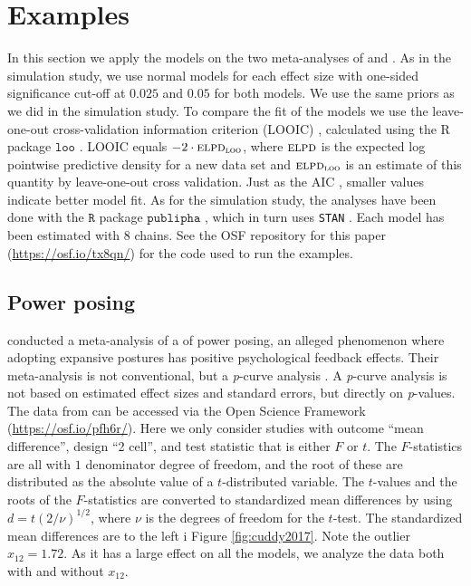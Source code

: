 \documentclass{article}
\theoremstyle{plain}
\theoremstyle{definition}
\renewcommand{\sqrt}[1]{(#1)^{1/2}}
\begin{document}
\section{Examples}\label{sect:examples}
In this section we apply the models on the two meta-analyses of \citet{cuddy2018p} and \citet{anderson2010violent}. As in the simulation study, we use normal models for each effect size with one-sided significance cut-off at $0.025$ and $0.05$ for both models. We use the same priors as we did in the simulation study. To compare the fit of the models we use the leave-one-out cross-validation information criterion (\textsc{LOOIC}) \citep{loo_article}, calculated using the R \citep{R} package $\mathtt{loo}$ \citep{loo}. LOOIC equals $-2\cdot\textsc{elpd}_{\textsc{loo}}$, where $\textsc{elpd}$ is the expected log pointwise predictive density for a new data set and $\textsc{elpd}_\textsc{loo}$ is an estimate of this quantity by leave-one-out cross validation. Just as the \textsc{AIC} \citep{akaike1998information}, smaller values indicate better model fit. As for the simulation study, the analyses have been done with the $\mathtt{R}$ package $\mathtt{publipha}$ \citep{publipha}, which in turn uses \texttt{STAN} \citep{Carpenter2017-cf}. Each model has been estimated with $8$ chains. See the OSF repository for this paper (\url{https://osf.io/tx8qn/}) for the code used to run the examples.

\subsection{Power posing\label{subsec:cuddy2018}}

\citet{cuddy2018p} conducted a meta-analysis of a of power posing, an alleged phenomenon where adopting expansive postures has positive psychological feedback effects. Their meta-analysis is not conventional, but a \textit{p}-curve analysis \citep{simonsohn2014p}. A \textit{p}-curve analysis is not based on estimated effect sizes and standard errors, but directly on \textit{p}-values. The data from \citep{cuddy2018p} can be accessed via the Open Science Framework (\url{https://osf.io/pfh6r/}). Here we only consider studies with outcome \enquote{mean difference}, design \enquote{2 cell}, and test statistic that is either $F$ or $t$. The $F$-statistics are all with $1$ denominator degree of freedom, and the root of these are distributed as the absolute value of a $t$-distributed variable. The $t$-values and the roots of the $F$-statistics are converted to standardized mean differences by using $d = t\sqrt{2/\nu}$, where $\nu$ is the degrees of freedom for the $t$-test. The standardized mean differences are to the left i Figure \ref{fig:cuddy2017}. Note the outlier $x_{12} = 1.72$. As it has a large effect on all the models, we analyze the data both with and without $x_{12}$.
\end{document}
